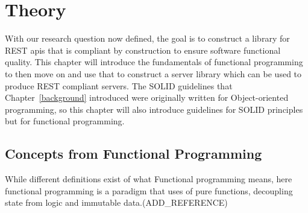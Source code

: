 \chapter{Theory}\label{theory} 

With our research question now defined, the goal is to construct a library for
REST apis that is compliant by construction to ensure software functional
quality. This chapter will introduce the fundamentals of functional programming
to then move on and use that to construct a server library which can be used to
produce REST compliant servers. The SOLID guidelines that
Chapter~\ref{background} introduced were originally written for Object-oriented
programming, so this chapter will also introduce guidelines for SOLID principles
but for functional programming. 

\section{Concepts from Functional Programming}\label{functionalprogramming}

 While different definitions exist of what Functional programming means, here 
 functional programming is a paradigm that uses of pure functions,
 decoupling state from logic and immutable data.(ADD\_REFERENCE)

